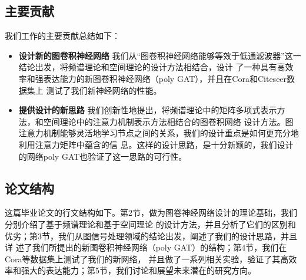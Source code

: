 \subsection{主要贡献}
我们工作的主要贡献总结如下：
\begin{itemize}
    \item \textbf{设计新的图卷积神经网络} \quad
    我们从“图卷积神经网络能够等效于低通滤波器”这一结论出发，将频谱理论和空间理论的设计方法相结合，设计
    了一种具有高效率和强表达能力的新图卷积神经网络（poly GAT），并且在Cora和Citeseer数据集上
    测试了我们新神经网络的性能。
    
    \item \textbf{提供设计的新思路} \quad
    我们创新性地提出，将频谱理论中的矩阵多项式表示方法，和空间理论中的注意力机制表示方法相结合的图卷积网络
    设计方法。图注意力机制能够灵活地学习节点之间的关系，我们的设计重点是如何更充分地利用注意力矩阵中蕴含的信
    息。这样的设计思路，是十分新颖的，我们设计的网络poly GAT也验证了这一思路的可行性。
\end{itemize}

\subsection{论文结构}
这篇毕业论文的行文结构如下。第2节，做为图卷神经网络设计的理论基础，我们分别介绍了基于频谱理论和基于空间理论
的设计方法，并且分析了它们的区别和优劣；第3节，我们从图信号处理领域的结论出发，阐述了我们的设计思路，并且详
述了我们所提出的新图卷积神经网络（poly GAT）的结构；第4节，我们在Cora等数据集上测试了我们的新网络，
并且做了一系列相关实验，验证了其高效率和强大的表达能力；第5节，我们讨论和展望未来潜在的研究方向。